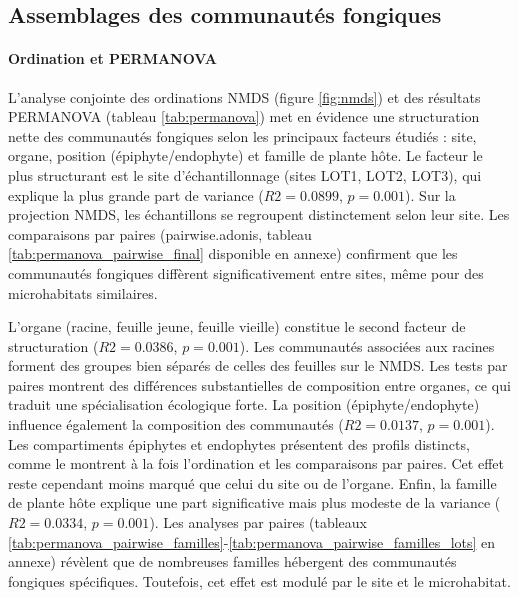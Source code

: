 \documentclass[a4paper,12pt]{article}
\begin{document}
\subsection{Assemblages des communautés fongiques}



\paragraph{Ordination et PERMANOVA}


L’analyse conjointe des ordinations NMDS (figure \ref{fig:nmds}) et des résultats PERMANOVA (tableau \ref{tab:permanova}) met en évidence une structuration nette des communautés fongiques selon les principaux facteurs étudiés : site, organe, position (épiphyte/endophyte) et famille de plante hôte. Le facteur le plus structurant est le site d’échantillonnage (sites LOT1, LOT2, LOT3), qui explique la plus grande part de variance ($R2 = 0.0899$, $p = 0.001$). Sur la projection NMDS, les échantillons se regroupent distinctement selon leur site. Les comparaisons par paires (pairwise.adonis, tableau \ref{tab:permanova_pairwise_final} disponible en annexe) confirment que les communautés fongiques diffèrent significativement entre sites, même pour des microhabitats similaires.

L’organe (racine, feuille jeune, feuille vieille) constitue le second facteur de structuration ($R2 = 0.0386$, $p = 0.001$). Les communautés associées aux racines forment des groupes bien séparés de celles des feuilles sur le NMDS. Les tests par paires montrent des différences substantielles de composition entre organes, ce qui traduit une spécialisation écologique forte. La position (épiphyte/endophyte) influence également la composition des communautés ($R2 = 0.0137$, $p = 0.001$). Les compartiments épiphytes et endophytes présentent des profils distincts, comme le montrent à la fois l’ordination et les comparaisons par paires. Cet effet reste cependant moins marqué que celui du site ou de l’organe.
Enfin, la famille de plante hôte explique une part significative mais plus modeste de la variance ($R2 = 0.0334$, $p = 0.001$). Les analyses par paires (tableaux \ref{tab:permanova_pairwise_familles}-\ref{tab:permanova_pairwise_familles_lots} en annexe) révèlent que de nombreuses familles hébergent des communautés fongiques spécifiques. Toutefois, cet effet est modulé par le site et le microhabitat.
\end{document}
